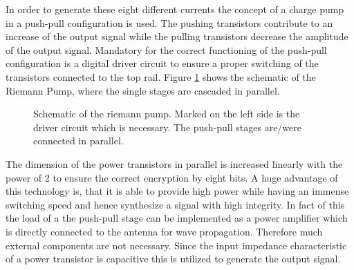 \documentclass[journal]{IEEEtran}
\begin{document}
%
In order to generate these eight different currents the concept of a charge pump in a push-pull configuration is used.
The pushing transistors contribute to an increase of the output signal while the pulling transistors decrease the amplitude of the output signal.
Mandatory for the correct functioning of the push-pull configuration is a digital driver circuit to ensure a proper switching of the transistors connected to the top rail.
Figure \ref{fig:schematic_multibit_rp} shows the schematic of the Riemann Pump, where the single stages are cascaded in parallel.
%
\begin{figure}[htb]
  \centering
	\begin{scriptsize}
  	\def\svgwidth{\columnwidth}
 	 
  	\caption{Schematic of the riemann pump. Marked on the left side is the driver circuit which is necessary. The push-pull stages are/were connected in parallel.}
  	\label{fig:schematic_multibit_rp}
	\end{scriptsize}
\end{figure}
The dimension of the power transistors in parallel is increased linearly with the power of 2 to ensure the correct encryption by eight bits.
A huge advantage of this technology is, that it is able to provide high power while having an immense switching speed and hence synthesize a signal with high integrity.
In fact of this the load of a the push-pull stage can be implemented as a power amplifier which is directly connected to the antenna for wave propagation.
Therefore much external components are not necessary.
Since the input impedance characteristic of a power transistor is capacitive this is utilized to generate the output signal.
\end{document}
